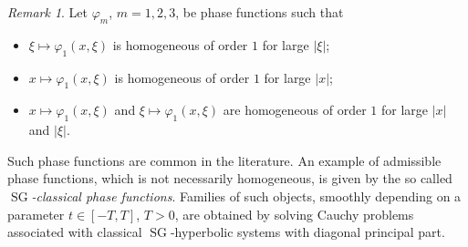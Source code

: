 \documentclass[12pt,a4paper,reqno]{amsart}
\numberwithin{equation}{section}
\numberwithin{thm}{section}
\theoremstyle{definition}
\theoremstyle{remark}
\newtheorem{rem}[thm]{Remark}
\begin{document}
\begin{rem}\label{rem:transfcharbis}
Let ${\varphi} _m$, $m=1,2,3$, be phase functions such that
\begin{itemize}
\item $\xi \mapsto {\varphi} _1(x,\xi )$ is homogeneous of order $1$
for large $|\xi |$;

{\vspace{0.1cm}}

\item $x \mapsto {\varphi} _1(x,\xi )$ is homogeneous of order $1$
for large $|x|$;

{\vspace{0.1cm}}

\item $x \mapsto {\varphi} _1(x,\xi )$ and $\xi \mapsto {\varphi} _1(x,\xi )$ are
homogeneous of order $1$ for large $|x|$ and $|\xi |$.
\end{itemize}

\par

Such phase functions are common in the literature.
An example of admissible phase functions, which is not necessarily
homogeneous, is given by the so called \emph{${\operatorname{SG}}$-classical phase
functions}. Families of such objects, smoothly depending on  a
parameter $t\in[-T,T]$, $T>0$, are obtained by solving Cauchy
problems associated with classical ${\operatorname{SG}}$-hyperbolic systems
with diagonal principal part.


\end{rem}
\end{document}
